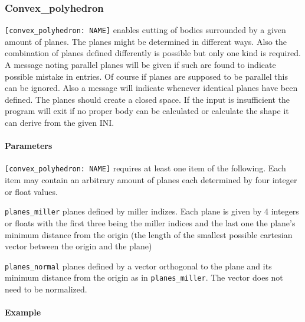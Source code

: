 \subsubsection{Convex\_polyhedron}

\lstinline{[convex_polyhedron: NAME]} enables cutting of bodies surrounded by a given amount of planes. The planes might be determined in different ways. Also the combination of planes defined differently is possible but only one kind is required. A message noting parallel planes will be given if such are found to indicate possible mistake in entries. Of course if planes are supposed to be parallel this can be ignored. Also a message will indicate whenever identical planes have been defined. The planes should create a closed space. If the input is insufficient the program will exit if no proper body can be calculated or calculate the shape it can derive from the given INI.

\paragraph{Parameters}
\lstinline{[convex_polyhedron: NAME]} requires at least one item of the following. Each item may contain an arbitrary amount of planes each determined by four integer or float values.
\begin{description}
 \item{\lstinline{planes_miller}} planes defined by miller indizes. Each plane is given by 4 integers or floats with the first three being the miller indices and the last one the plane's minimum distance from the origin (the length of the smallest possible cartesian vector between the origin and the plane)
 \item{\lstinline{planes_normal}} planes defined by a vector orthogonal to the plane and its minimum distance from the origin as in \lstinline{planes_miller}. The vector does not need to be normalized.
\end{description} 

\paragraph{Example}\

